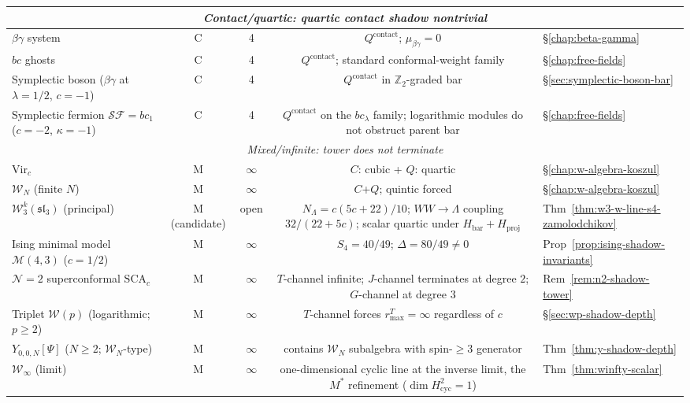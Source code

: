 \begin{table}[ht]
{{\begin{tabular}{|l|c|c|c|l|}
\hline
\multicolumn{5}{|c|}{\textit{Contact/quartic: quartic contact shadow nontrivial}} \\
\hline
$\beta\gamma$ system & C & 4 & $Q^{\mathrm{contact}}$; $\mu_{\beta\gamma}=0$ & \S\ref{chap:beta-gamma} \\
\hline
$bc$ ghosts & C & 4 & $Q^{\mathrm{contact}}$; standard conformal-weight family & \S\ref{chap:free-fields} \\
\hline
Symplectic boson ($\beta\gamma$ at $\lambda=1/2$, $c=-1$) & C & 4 & $Q^{\mathrm{contact}}$ in $\mathbb{Z}_2$-graded bar & \S\ref{sec:symplectic-boson-bar} \\
\hline
Symplectic fermion $\mathcal{SF}=bc_1$ ($c=-2$, $\kappa=-1$) & C & 4 & $Q^{\mathrm{contact}}$ on the $bc_\lambda$ family; logarithmic modules do not obstruct parent bar & \S\ref{chap:free-fields} \\
\hline
\multicolumn{5}{|c|}{\textit{Mixed/infinite: tower does not terminate}} \\
\hline
$\mathrm{Vir}_c$ & M & $\infty$ & $C$: cubic + $Q$: quartic & \S\ref{chap:w-algebra-koszul} \\
\hline
$\mathcal{W}_N$ (finite $N$) & M & $\infty$ & $C$+$Q$; quintic forced & \S\ref{chap:w-algebra-koszul} \\
\hline
$\mathcal{W}_3^k(\mathfrak{sl}_3)$ (principal) & M (candidate) & open & $N_\Lambda=c(5c{+}22)/10$; $WW\to\Lambda$ coupling $32/(22{+}5c)$; scalar quartic under $H_{\mathrm{bar}}+H_{\mathrm{proj}}$ & Thm~\ref{thm:w3-w-line-s4-zamolodchikov} \\
\hline
Ising minimal model $\mathcal{M}(4,3)$ ($c=1/2$) & M & $\infty$ & $S_4 = 40/49$; $\Delta = 80/49 \neq 0$ & Prop~\ref{prop:ising-shadow-invariants} \\
\hline
$\mathcal{N}{=}2$ superconformal $\mathrm{SCA}_c$ & M & $\infty$ & $T$-channel infinite; $J$-channel terminates at degree $2$; $G$-channel at degree $3$ & Rem~\ref{rem:n2-shadow-tower} \\
\hline
Triplet $\mathcal{W}(p)$ (logarithmic; $p \geq 2$) & M & $\infty$ & $T$-channel forces $r_{\max}^T = \infty$ regardless of $c$ & \S\ref{sec:wp-shadow-depth} \\
\hline
$Y_{0,0,N}[\Psi]$ ($N \geq 2$; $\mathcal{W}_N$-type) & M & $\infty$ & contains $\mathcal{W}_N$ subalgebra with spin-$\geq 3$ generator & Thm~\ref{thm:y-shadow-depth} \\
\hline
$\mathcal{W}_\infty$ (limit) & M & $\infty$ & one-dimensional cyclic line at the inverse limit, the $M^*$ refinement ($\dim H^2_{\mathrm{cyc}}=1$) & Thm~\ref{thm:winfty-scalar} \\

\end{tabular}}}
\end{table}
